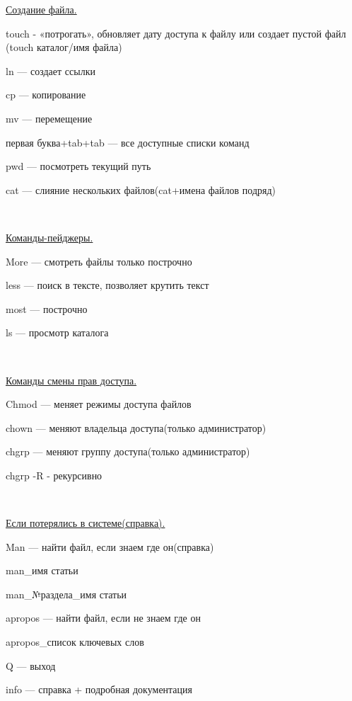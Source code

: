 \par 
\underline{Создание файла.}
\par 
touch - «потрогать», обновляет дату доступа
к файлу или создает пустой файл (touch
каталог/имя файла)
\par 
ln — создает ссылки
\par 
cp — копирование 

\par 
mv — перемещение
\par 
первая буква+tab+tab — все доступные списки
команд
\par 
pwd — посмотреть текущий путь
\par 
cat — слияние нескольких файлов(cat+имена
файлов подряд)
\par 
\\

\par 
\underline{Команды-пейджеры.}
\par 
More — смотреть файлы только построчно
\par 
less — поиск в тексте, позволяет крутить
текст
\par 
most — построчно 

\par 
ls — просмотр каталога
\par 
\\

\par 
\underline{Команды смены прав доступа.}
\par 
Chmod — меняет режимы доступа файлов
\par 
chown — меняют владельца доступа(только
администратор)
\par 
chgrp — меняют группу доступа(только
администратор)
\par 
chgrp -R - рекурсивно
\par 
\\

\par 
\underline{Если потерялись в системе(справка).}
\par 
Man — найти файл, если знаем где он(справка)
\par 
man\_имя статьи
\par 
man\_№раздела\_имя статьи
\par 
apropos — найти файл, если не знаем где он
\par 
apropos\_список ключевых слов
\par 
Q — выход
\par 
info — справка + подробная документация
\par 
\\

